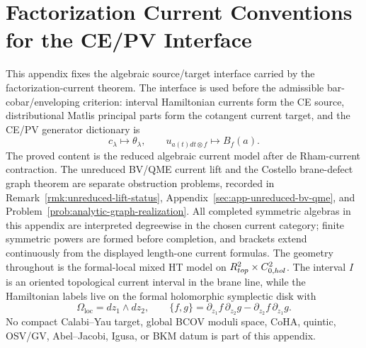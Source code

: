 \section{Factorization Current Conventions for the CE/PV Interface}
\label{sec:app-factorization-current-conventions}

This appendix fixes the algebraic source/target interface carried by
the factorization-current theorem.  The interface is used before the
admissible bar-cobar/enveloping criterion: interval Hamiltonian
currents form the CE source, distributional Matlis principal parts form
the cotangent current target, and the CE/PV generator dictionary is
\[
  c_\lambda\longmapsto\theta_\lambda,\qquad
  u_{a(t)dt\otimes f}\longmapsto B_f(a).
\]
The proved content is the reduced algebraic current model after
de Rham-current contraction.  The unreduced BV/QME current lift and the
Costello brane-defect graph theorem are separate obstruction problems,
recorded in Remark~\ref{rmk:unreduced-lift-status},
Appendix~\ref{sec:app-unreduced-bv-qme}, and
Problem~\ref{prob:analytic-graph-realization}.
All completed symmetric algebras in this appendix are interpreted
degreewise in the chosen current category; finite symmetric powers are
formed before completion, and brackets extend continuously from the
displayed length-one current formulas.
The geometry throughout is the formal-local mixed HT model on
\(R^2_{top}\times C^2_{0,hol}\).  The
interval \(I\) is an oriented topological current interval in the brane
line, while the Hamiltonian labels live on the formal holomorphic
symplectic disk with
\[
  \Omega_{\mathrm{loc}}=dz_1\wedge dz_2,\qquad
  \{f,g\}=\partial_{z_1}f\,\partial_{z_2}g
    -\partial_{z_2}f\,\partial_{z_1}g .
\]
No compact Calabi--Yau target, global BCOV moduli space, CoHA, quintic,
OSV/GV, Abel--Jacobi, Igusa, or BKM datum is part of this appendix.

